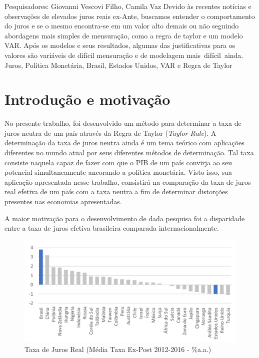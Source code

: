     {\noindent Pesquisadores: Giovanni Vescovi Filho, Camila Vaz}
    {Devido às recentes notícias e observações de elevados juros reais ex-Ante, buscamos entender o comportamento do juros e se o mesmo encontra-se em um valor alto demais ou não seguindo abordagens mais simples de mensuração, como a regra de taylor e um modelo VAR. Após os modelos e seus resultados, algumas das justificativas para os valores são variáveis de difícil mensuração e de modelagem mais difícil ainda.}
    {Juros, Política Monetária, Brasil, Estados Unidos, VAR e Regra de Taylor
    }

\section*{Introdu\c{c}\~{a}o e motiva\c{c}\~{a}o }

 No presente trabalho, foi desenvolvido um m\'{e}todo para determinar a taxa de juros neutra de um pa\'{i}s atrav\'{e}s da Regra de Taylor (\textit{Taylor Rule}). A determina\c{c}\~{a}o da taxa de juros neutra ainda \'{e} um tema te\'{o}rico com aplica\c{c}\~{o}es diferentes no mundo atual por seus diferentes m\'{e}todos de determina\c{c}\~{a}o. Tal taxa consiste naquela capaz de fazer com que o PIB de um pa\'{i}s convirja ao seu potencial simultaneamente ancorando a pol\'{i}tica monet\'{a}ria. Visto isso, sua aplica\c{c}\~{a}o apresentada nesse trabalho, consistir\'{a} na compara\c{c}\~{a}o da taxa de juros real efetiva de um pa\'{i}s com a taxa neutra a fim de determinar distor\c{c}\~{o}es presentes nas economias apresentadas.

A maior motiva\c{c}\~{a}o para o desenvolvimento de dada pesquisa foi a disparidade entre a taxa de juros efetiva brasileira comparada internacionalmente.

\begin{figure}
    \centering
    \caption{Taxa de Juros Real (Média Taxa Ex-Post 2012-2016 - \%a.a.)}
    \includegraphics[width = \linewidth]{relatorios/macro/imagens/grafico1}
\end{figure}

